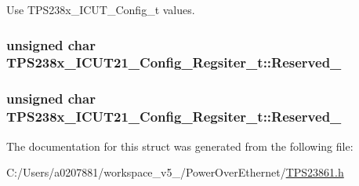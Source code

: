 Use T\-P\-S238x\-\_\-\-I\-C\-U\-T\-\_\-\-Config\-\_\-t values. 

\hypertarget{struct_t_p_s238x___i_c_u_t21___config___regsiter__t_a049be26da0843f6005b8a2728ee668c6}{
\subsubsection[{Reserved\-\_\-8}]{\setlength{\rightskip}{0pt plus 5cm}unsigned char T\-P\-S238x\-\_\-\-I\-C\-U\-T21\-\_\-\-Config\-\_\-\-Regsiter\-\_\-t\-::\-Reserved\-\_}}\label{struct_t_p_s238x___i_c_u_t21___config___regsiter__t_a049be26da0843f6005b8a2728ee668c6}
\hypertarget{struct_t_p_s238x___i_c_u_t21___config___regsiter__t_aeb7c89e5adbe42f7fb0af1a852550efc}{
\subsubsection[{Reserved\-\_\-9}]{\setlength{\rightskip}{0pt plus 5cm}unsigned char T\-P\-S238x\-\_\-\-I\-C\-U\-T21\-\_\-\-Config\-\_\-\-Regsiter\-\_\-t\-::\-Reserved\-\_}}\label{struct_t_p_s238x___i_c_u_t21___config___regsiter__t_aeb7c89e5adbe42f7fb0af1a852550efc}


The documentation for this struct was generated from the following file\-:\begin{DoxyCompactItemize}
\item 
C\-:/\-Users/a0207881/workspace\-\_\-v5\-\_/\-Power\-Over\-Ethernet/\hyperlink{_t_p_s23861_8h}{T\-P\-S23861.\-h}\end{DoxyCompactItemize}
